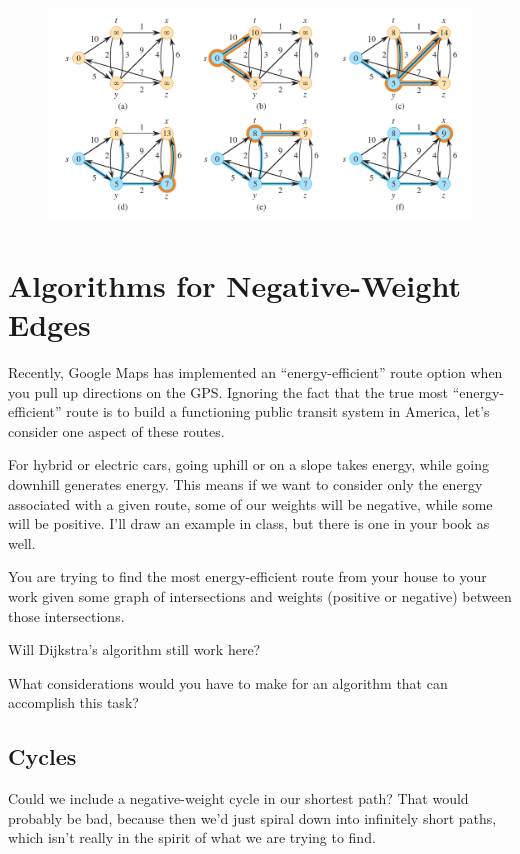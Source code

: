 \documentclass[]{article}
\begin{document}
\begin{figure}[h!]
    \includegraphics[width=\textwidth]{djikstra.png}
\end{figure}


\section*{Algorithms for Negative-Weight Edges}

Recently, Google Maps has implemented an ``energy-efficient'' route option when you pull up directions on the GPS. Ignoring the fact that the true most ``energy-efficient'' route is to build a functioning public transit system in America, let's consider one aspect of these routes.

For hybrid or electric cars, going uphill or on a slope takes energy, while going downhill generates energy. This means if we want to consider only the energy associated with a given route, some of our weights will be negative, while some will be positive. I'll draw an example in class, but there is one in your book as well.

You are trying to find the most energy-efficient route from your house to your work given some graph of intersections and weights (positive or negative) between those intersections. 

Will Dijkstra's algorithm still work here?

What considerations would you have to make for an algorithm that can accomplish this task?

\subsection*{Cycles}

Could we include a negative-weight cycle in our shortest path? That would probably be bad, because then we'd just spiral down into infinitely short paths, which isn't really in the spirit of what we are trying to find. 
\end{document}
